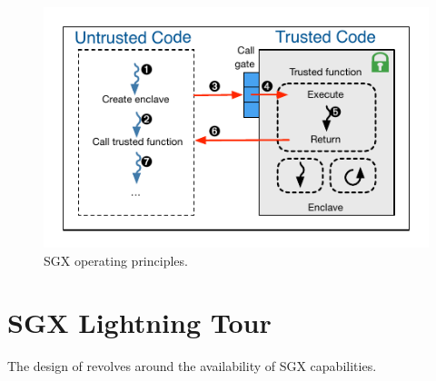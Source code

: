 \begin{figure}[!t]
  \centering
  \includegraphics[scale=0.8]{images/sgx.pdf}
  \caption{SGX operating principles.}
  \label{fig:sgx}
\end{figure}

\section{SGX Lightning Tour}
\label{sec:background}
The design of \SYS revolves around the availability of SGX capabilities.
